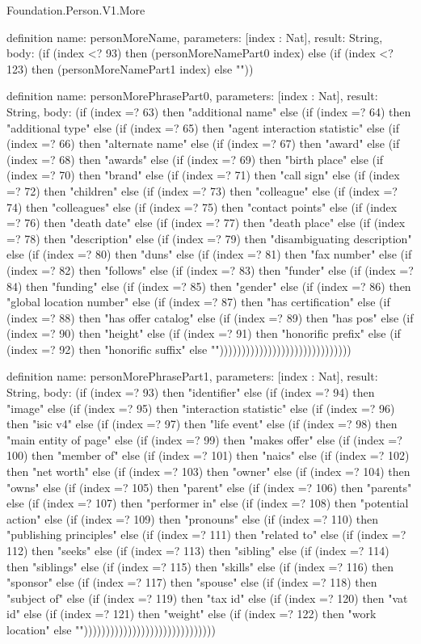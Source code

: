 \begin{lexlean}{Foundation.Person.V1.More}
\begin{semanticmodule}
definition{
  name: personMoreName,
  parameters: [index : Nat],
  result: String,
  body: (if (index <? 93) then (personMoreNamePart0 index) else (if (index <? 123) then (personMoreNamePart1 index) else ""))
}

definition{
  name: personMorePhrasePart0,
  parameters: [index : Nat],
  result: String,
  body: (if (index =? 63) then "additional name" else (if (index =? 64) then "additional type" else (if (index =? 65) then "agent interaction statistic" else (if (index =? 66) then "alternate name" else (if (index =? 67) then "award" else (if (index =? 68) then "awards" else (if (index =? 69) then "birth place" else (if (index =? 70) then "brand" else (if (index =? 71) then "call sign" else (if (index =? 72) then "children" else (if (index =? 73) then "colleague" else (if (index =? 74) then "colleagues" else (if (index =? 75) then "contact points" else (if (index =? 76) then "death date" else (if (index =? 77) then "death place" else (if (index =? 78) then "description" else (if (index =? 79) then "disambiguating description" else (if (index =? 80) then "duns" else (if (index =? 81) then "fax number" else (if (index =? 82) then "follows" else (if (index =? 83) then "funder" else (if (index =? 84) then "funding" else (if (index =? 85) then "gender" else (if (index =? 86) then "global location number" else (if (index =? 87) then "has certification" else (if (index =? 88) then "has offer catalog" else (if (index =? 89) then "has pos" else (if (index =? 90) then "height" else (if (index =? 91) then "honorific prefix" else (if (index =? 92) then "honorific suffix" else ""))))))))))))))))))))))))))))))
}

definition{
  name: personMorePhrasePart1,
  parameters: [index : Nat],
  result: String,
  body: (if (index =? 93) then "identifier" else (if (index =? 94) then "image" else (if (index =? 95) then "interaction statistic" else (if (index =? 96) then "isic v4" else (if (index =? 97) then "life event" else (if (index =? 98) then "main entity of page" else (if (index =? 99) then "makes offer" else (if (index =? 100) then "member of" else (if (index =? 101) then "naics" else (if (index =? 102) then "net worth" else (if (index =? 103) then "owner" else (if (index =? 104) then "owns" else (if (index =? 105) then "parent" else (if (index =? 106) then "parents" else (if (index =? 107) then "performer in" else (if (index =? 108) then "potential action" else (if (index =? 109) then "pronouns" else (if (index =? 110) then "publishing principles" else (if (index =? 111) then "related to" else (if (index =? 112) then "seeks" else (if (index =? 113) then "sibling" else (if (index =? 114) then "siblings" else (if (index =? 115) then "skills" else (if (index =? 116) then "sponsor" else (if (index =? 117) then "spouse" else (if (index =? 118) then "subject of" else (if (index =? 119) then "tax id" else (if (index =? 120) then "vat id" else (if (index =? 121) then "weight" else (if (index =? 122) then "work location" else ""))))))))))))))))))))))))))))))
}


\end{semanticmodule}
\end{lexlean}
